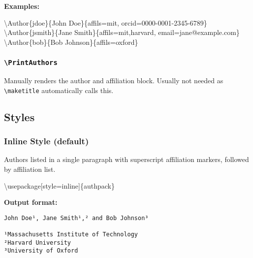 \documentclass[
]{article}
\newenvironment{Shaded}{}{}
\newcommand{\BuiltInTok}[1]{#1}
\newcommand{\ExtensionTok}[1]{#1}
\newcommand{\FunctionTok}[1]{\textcolor[rgb]{0.02,0.16,0.49}{#1}}
\newcommand{\NormalTok}[1]{#1}
\begin{document}
\textbf{Examples:}

\begin{Shaded}
\begin{Highlighting}[]
\FunctionTok{\textbackslash{}Author}\NormalTok{\{jdoe\}\{John Doe\}\{affils=mit, orcid=0000{-}0001{-}2345{-}6789\}}
\FunctionTok{\textbackslash{}Author}\NormalTok{\{jsmith\}\{Jane Smith\}\{affils=mit,harvard, email=jane@example.com\}}
\FunctionTok{\textbackslash{}Author}\NormalTok{\{bob\}\{Bob Johnson\}\{affils=oxford\}}
\end{Highlighting}
\end{Shaded}

\hypertarget{printauthors}{%
\subsubsection{\texorpdfstring{\texttt{\textbackslash{}PrintAuthors}}{\textbackslash PrintAuthors}}\label{printauthors}}

Manually renders the author and affiliation block. Usually not needed as
\texttt{\textbackslash{}maketitle} automatically calls this.

\hypertarget{styles}{%
\subsection{Styles}\label{styles}}

\hypertarget{inline-style-default}{%
\subsubsection{Inline Style (default)}\label{inline-style-default}}

Authors listed in a single paragraph with superscript affiliation
markers, followed by affiliation list.

\begin{Shaded}
\begin{Highlighting}[]
\BuiltInTok{\textbackslash{}usepackage}\NormalTok{[style=inline]\{}\ExtensionTok{authpack}\NormalTok{\}}
\end{Highlighting}
\end{Shaded}

\textbf{Output format:}

\begin{verbatim}
John Doe¹, Jane Smith¹,² and Bob Johnson³

¹Massachusetts Institute of Technology
²Harvard University
³University of Oxford
\end{verbatim}
\end{document}

